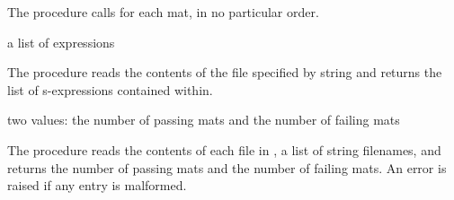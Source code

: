 \documentclass[letterpaper,11pt,twoside,final]{article}
\begin{document}
The  procedure calls  for each mat, in no particular order.

\begin{procedure}
\end{procedure}
\returns{} a list of expressions

The  procedure reads the contents of the file
specified by string  and returns the list of
s-expressions contained within.

\begin{procedure}
\end{procedure}
\returns{} two values: the number of passing mats and the number of
failing mats

The  procedure reads the contents of each file in
, a list of string filenames, and returns the number of
passing mats and the number of failing mats. An error is raised if any
entry is malformed.
\end{document}
